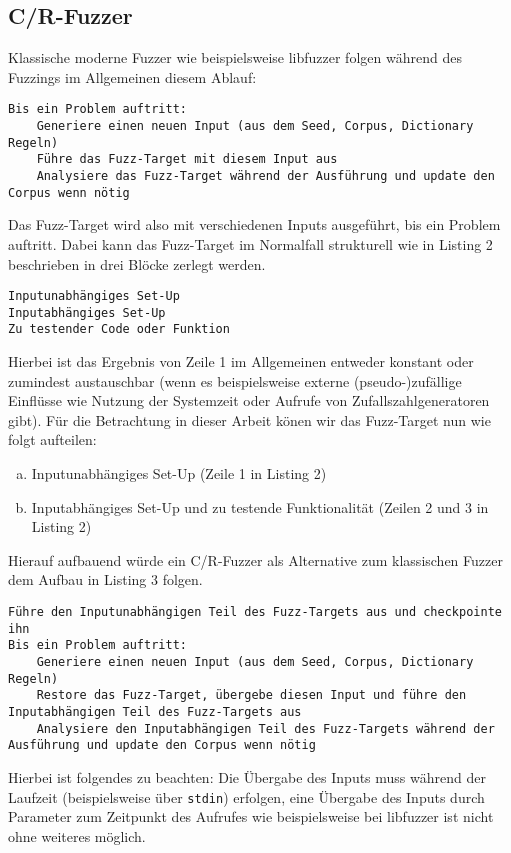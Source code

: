 \documentclass[a4paper]{article}
\begin{document}
\subsection{C/R-Fuzzer}
Klassische moderne Fuzzer wie beispielsweise libfuzzer folgen während des Fuzzings im Allgemeinen diesem Ablauf:
\begin{lstlisting}[caption=Struktur klassischer Non-C/R-Fuzzer]
Bis ein Problem auftritt:
    Generiere einen neuen Input (aus dem Seed, Corpus, Dictionary Regeln)
    Führe das Fuzz-Target mit diesem Input aus
    Analysiere das Fuzz-Target während der Ausführung und update den Corpus wenn nötig
\end{lstlisting}
Das Fuzz-Target wird also mit verschiedenen Inputs ausgeführt, bis ein Problem auftritt. Dabei kann das Fuzz-Target im Normalfall strukturell wie in Listing 2 beschrieben in drei Blöcke zerlegt werden.
\begin{lstlisting}[caption=Struktur klassischen Fuzztargets]
Inputunabhängiges Set-Up
Inputabhängiges Set-Up
Zu testender Code oder Funktion
\end{lstlisting}
Hierbei ist das Ergebnis von Zeile 1 im Allgemeinen entweder konstant oder zumindest austauschbar (wenn es beispielsweise externe (pseudo-)zufällige Einflüsse wie Nutzung der Systemzeit oder Aufrufe von Zufallszahlgeneratoren gibt). Für die Betrachtung in dieser Arbeit könen wir das Fuzz-Target nun wie folgt aufteilen:
\begin{enumerate}[(a)]
    \item Inputunabhängiges Set-Up (Zeile 1 in Listing 2)
    \item Inputabhängiges Set-Up und zu testende Funktionalität (Zeilen 2 und 3 in Listing 2)
\end{enumerate}
Hierauf aufbauend würde ein C/R-Fuzzer als Alternative zum klassischen Fuzzer dem Aufbau in Listing 3 folgen.
\begin{lstlisting}[caption=Struktur einfacher C/R-Fuzzer]
Führe den Inputunabhängigen Teil des Fuzz-Targets aus und checkpointe ihn
Bis ein Problem auftritt:
    Generiere einen neuen Input (aus dem Seed, Corpus, Dictionary Regeln)
    Restore das Fuzz-Target, übergebe diesen Input und führe den Inputabhängigen Teil des Fuzz-Targets aus
    Analysiere den Inputabhängigen Teil des Fuzz-Targets während der Ausführung und update den Corpus wenn nötig
\end{lstlisting}
Hierbei ist folgendes zu beachten: 
Die Übergabe des Inputs muss während der Laufzeit (beispielsweise über \texttt{stdin}) erfolgen, eine Übergabe des Inputs durch Parameter zum Zeitpunkt des Aufrufes wie beispielsweise bei libfuzzer ist nicht ohne weiteres möglich. 
\end{document}
